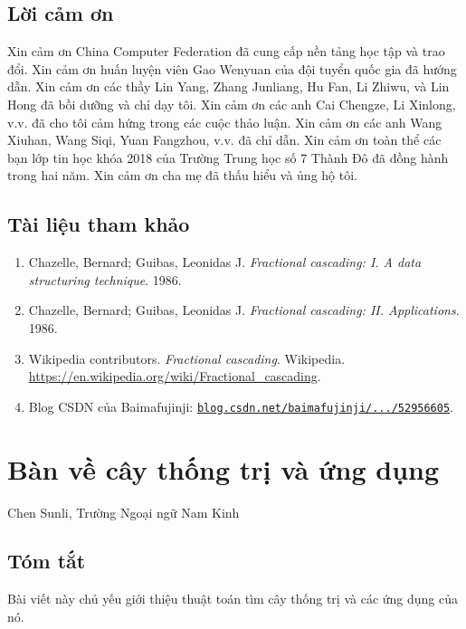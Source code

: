 \documentclass[11pt]{article}
\begin{document}
\subsection*{Lời cảm ơn}

Xin cảm ơn China Computer Federation đã cung cấp nền tảng học tập và trao đổi.
Xin cảm ơn huấn luyện viên Gao Wenyuan của đội tuyển quốc gia đã hướng dẫn.
Xin cảm ơn các thầy Lin Yang, Zhang Junliang, Hu Fan, Li Zhiwu, và Lin Hong đã
bồi dưỡng và chỉ dạy tôi. Xin cảm ơn các anh Cai Chengze, Li Xinlong, v.v. đã
cho tôi cảm hứng trong các cuộc thảo luận. Xin cảm ơn các anh Wang Xiuhan,
Wang Siqi, Yuan Fangzhou, v.v. đã chỉ dẫn. Xin cảm ơn toàn thể các bạn lớp tin
học khóa 2018 của Trường Trung học số 7 Thành Đô đã đồng hành trong hai năm.
Xin cảm ơn cha mẹ đã thấu hiểu và ủng hộ tôi.

\subsection*{Tài liệu tham khảo}

\begin{enumerate}
  \item Chazelle, Bernard; Guibas, Leonidas J. \emph{Fractional cascading: I. A
  data structuring technique}. 1986.
  \item Chazelle, Bernard; Guibas, Leonidas J. \emph{Fractional cascading: II.
  Applications}. 1986.
  \item Wikipedia contributors. \emph{Fractional cascading}. Wikipedia.
  \url{https://en.wikipedia.org/wiki/Fractional_cascading}.
  \item Blog CSDN của Baimafujinji:
  \href{https://blog.csdn.net/baimafujinji/article/details/52956605}
  {\texttt{blog.csdn.net/baimafujinji/.../52956605}}.
\end{enumerate}

\section{Bàn về cây thống trị và ứng dụng}

\begin{center}
Chen Sunli, Trường Ngoại ngữ Nam Kinh
\end{center}

\subsection*{Tóm tắt}

Bài viết này chủ yếu giới thiệu thuật toán tìm cây thống trị và các ứng dụng
của nó.
\end{document}
